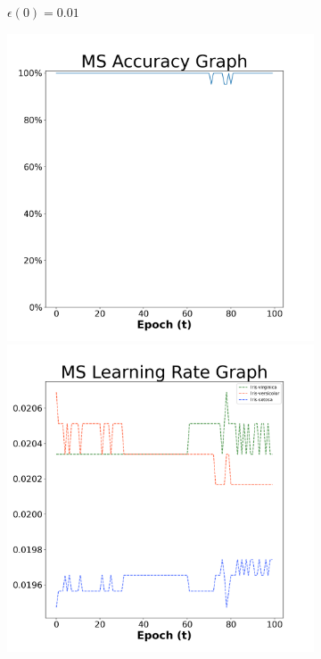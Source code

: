 \begin{figure}[H]
\begin{subfigure}{0.3\textwidth}
  \caption{$\epsilon(0)=0.01$}
\end{subfigure}\hfil %
\begin{subfigure}{0.3\textwidth}
  \includegraphics[width=\linewidth]{images/exper1/iris/MS_0.03_acc.png}
  \includegraphics[width=\linewidth]{images/exper1/iris/MS_0.03_lr.png}

\end{subfigure}
\end{figure}
